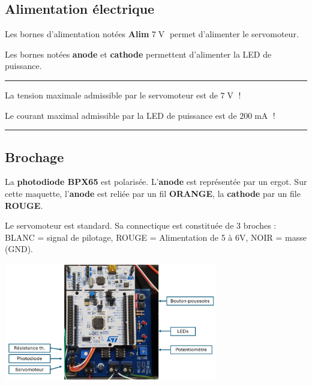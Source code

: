 \documentclass[a4paper,11pt,titlepage]{article} %
\begin{document}
\subsection{Alimentation électrique}

Les bornes d'alimentation notées \textbf{Alim} $7\operatorname{V}$ permet d'alimenter le servomoteur.

Les bornes notées \textbf{anode} et \textbf{cathode} permettent d'alimenter la LED de puissance.

\noindent \rule{\linewidth}{1pt}

{\LARGE La tension maximale admissible par le servomoteur est de $7\operatorname{V}$ !}

{\Large Le courant maximal admissible par la LED de puissance est de $200\operatorname{mA}$ !}

\noindent \rule{\linewidth}{1pt}


\subsection{Brochage}

La \textbf{photodiode BPX65} est polarisée. L'\textbf{anode} est représentée par un ergot. Sur cette maquette, l'\textbf{anode} est reliée par un fil \textbf{ORANGE}, la \textbf{cathode} par un file \textbf{ROUGE}.

Le servomoteur est standard. Sa connectique est constituée de 3 broches : BLANC = signal de pilotage, ROUGE = Alimentation de 5 à 6V, NOIR = masse (GND).


\begin{center}
	\includegraphics[width=0.7\textwidth]{images/maquette_rayon_nucleo.png}
\end{center}
\end{document}
